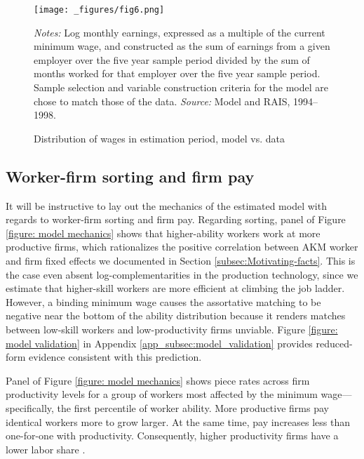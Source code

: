 \begin{figure}[!htb]
  \centering
  \caption{Distribution of wages in estimation period, model vs. data \label{figure: model fit}}
  \prefigvspace
  \texttt{[image: \_figures/fig6.png]} %
  \\
  \postfigvspace
  \begin{minipage}[t]{1\columnwidth}%
    \begin{spacing}{0.75}
      \emph{\scriptsize{}Notes: }{\scriptsize{}Log monthly earnings, expressed as a multiple of the current minimum wage, and constructed as the sum of earnings from a given employer over the five year sample period divided by the sum of months worked for that employer over the five year sample period. Sample selection and variable construction criteria for the model are chose to match those of the data. %
      \emph{\scriptsize{}Source: } Model and RAIS, 1994--1998.}
    \end{spacing}
  \end{minipage}
\end{figure}




\subsection{Worker-firm sorting and firm pay}

It will be instructive to lay out the mechanics of the estimated model with regards to worker-firm sorting and firm pay. Regarding sorting, panel  of Figure \ref{figure: model mechanics}  shows that higher-ability workers work at more productive firms, which rationalizes the positive correlation between AKM worker and firm fixed effects we documented in Section \ref{subsec:Motivating-facts}. This is the case even absent log-complementarities in the production technology, since we estimate that higher-skill workers are more efficient at climbing the job ladder. However, a binding minimum wage causes the assortative matching to be negative near the bottom of the ability distribution because it renders matches between low-skill workers and low-productivity firms unviable. Figure \ref{figure: model validation} in Appendix \ref{app_subsec:model_validation} provides reduced-form evidence consistent with this prediction.

Panel  of Figure \ref{figure: model mechanics} shows piece rates across firm productivity levels for a group of workers most affected by the minimum wage---specifically, the first percentile of worker ability. More productive firms pay identical workers more to grow larger. At the same time, pay increases less than one-for-one with productivity. Consequently, higher productivity firms have a lower labor share \citep{gouinbonenfant2020}.


